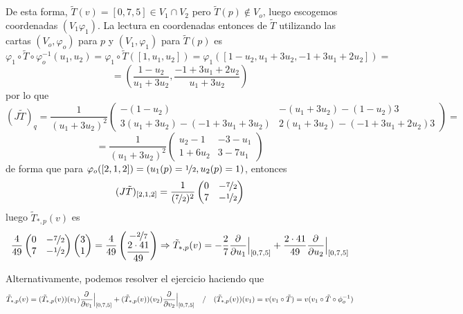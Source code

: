 \begin{sol}
    De esta forma, $\tilde{T}(v) = [0,7,5] \in V_1 \cap V_2 $ pero $\tilde{T}(p)\nin V_o$, luego escogemos coordenadas $(V_1\varphi_1)$. La lectura en coordenadas entonces de $\tilde T$ utilizando las cartas $(V_o, \varphi_o)$ para $p$ y $(V_1, \varphi_1)$ para $\tilde{T} (p)$ es
    $$\varphi_1 \circ \tilde T \circ \varphi_o^{-1}(u_1,u_2)=\varphi_1 \circ \tilde T([1,u_1,u_2]) = \varphi_1([1-u_2, u_1+3u_2,-1+3u_1+2u_2])=
    $$
    $$=\left( \dfrac{1-u_2}{u_1+3u_2},\dfrac{-1+3u_1+2u_2}{u_1+3u_2}\right)$$
    por lo que 
    $$(J\tilde T)_q = \dfrac{1}{(u_1+3u_2)^2} \begin{pmatrix}
        - (1-u_2) & - (u_1+3u_2)-(1-u_2)3\\ 
        3(u_1+3u_2) - (-1 +3u_1+3u_2) & 2(u_1+3u_2) - (-1 + 3u_1 + 2u_2) 3
    \end{pmatrix}= $$
    $$=\dfrac{1}{(u_1+3u_2)^2} \begin{pmatrix}
        u_2-1 & -3-u_1\\ 
       1+6u_2 & 3-7u_1
    \end{pmatrix} $$
    de forma que para $\varphi_o([2,1,2])=(u_1(p)=\nicefrac{1}{2}, u_2(p)=1)$, entonces
    $$(J\tilde T)_{[2,1,2]} = \dfrac{1}{(\nicefrac{7}{2})^2}\begin{pmatrix}
        0 & -\nicefrac{7}{2} \\ 7 & - \nicefrac{1}{2}
    \end{pmatrix}$$
    luego $\tilde T_{*,p} (v)$ es
    $$\dfrac{4}{49} \begin{pmatrix}
        0 & -\nicefrac{7}{2} \\ 7 & - \nicefrac{1}{2}
    \end{pmatrix} \begin{pmatrix}
        3 \\ 1 
    \end{pmatrix} =\dfrac{4}{49} \begin{pmatrix}
        -\nicefrac{2}{7} \\ \dfrac{2 \cdot 41}{49} 
    \end{pmatrix} \Rightarrow \tilde T_{*,p} (v) = -\dfrac{2}{7 } \dfrac{\partial^{} }{\partial u_1} \Big|_{[0,7,5]} + \dfrac{2 \cdot 41}{49} \dfrac{\partial^{} }{\partial u_2} \Big|_{[0,7,5]}$$

    Alternativamente, podemos resolver el ejercicio haciendo que 
    $$\tilde T_{*,p} (v) = (\tilde T_{*,p} (v))(v_1) \dfrac{\partial^{} }{\partial v_1} \Big|_{[0,7,5]}+(\tilde T_{*,p} (v))(v_2) \dfrac{\partial^{} }{\partial v_2} \Big|_{[0,7,5]} \quad / \quad (\tilde T_{*,p} (v))(v_1) = v(v_1 \circ \tilde T) = v(v_1\circ \tilde T \circ \phi_o^{-1}) $$
\end{sol}
